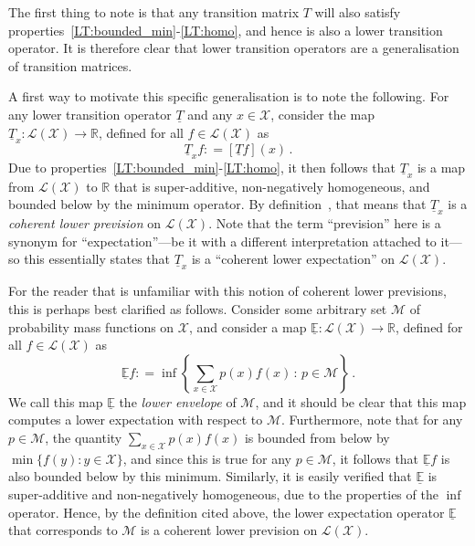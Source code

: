 \documentclass[10pt,a4paper]{paper}
\theoremstyle{definition}
\newcommand{\reals}{\mathbb{R}}
\newcommand{\states}{\mathcal{X}}
\newcommand{\lt}{\underline{T}}
\newcommand{\gambles}{\mathcal{L}}
\newcommand{\gamblesX}{\gambles(\states)}
\newcommand{\coloneqq}{:\!=}
\begin{document}
The first thing to note is that any transition matrix $T$ will also satisfy properties~\ref{LT:bounded_min}-\ref{LT:homo}, and hence is also a lower transition operator. It is therefore clear that lower transition operators are a generalisation of transition matrices.

A first way to motivate this specific generalisation is to note the following. For any lower transition operator $\lt$ and any $x\in\states$, consider the map $\lt_x:\gamblesX\to\reals$, defined for all $f\in\gamblesX$ as
\begin{equation}\label{eq:lowerprevisionfromlt}
\lt_xf \coloneqq \left[\lt f\right](x)\,.
\end{equation}
Due to properties~\ref{LT:bounded_min}-\ref{LT:homo}, it then follows that $\lt_x$ is a map from $\gamblesX$ to $\reals$ that is super-additive, non-negatively homogeneous, and bounded below by the minimum operator. By definition~\cite[Definition~2.3.3]{Walley:1991vk}, that means that $\lt_x$ is a \emph{coherent lower prevision} on $\gamblesX$. Note that the term ``prevision'' here is a synonym for ``expectation''---be it with a different interpretation attached to it---so this essentially states that $\lt_x$ is a ``coherent lower expectation'' on $\gamblesX$.

For the reader that is unfamiliar with this notion of coherent lower previsions, this is perhaps best clarified as follows. Consider some arbitrary set $\mathcal{M}$ of probability mass functions on $\states$, and consider a map $\underline{\mathbb{E}}:\gamblesX\to\reals$, defined for all $f\in\gamblesX$ as
\begin{equation*}
\underline{\mathbb{E}}f \coloneqq \inf\left\{\sum_{x\in\states} p(x)f(x)\,:\,p\in\mathcal{M}\right\}\,.
\end{equation*}
We call this map $\underline{\mathbb{E}}$ the \emph{lower envelope} of $\mathcal{M}$, and it should be clear that this map computes a lower expectation with respect to $\mathcal{M}$. Furthermore, note that for any $p\in\mathcal{M}$, the quantity $\sum_{x\in\states}p(x)f(x)$ is bounded from below by $\min\{f(y):y\in\states\}$, and since this is true for any $p\in\mathcal{M}$, it follows that $\underline{\mathbb{E}}f$ is also bounded below by this minimum. Similarly, it is easily verified that $\underline{\mathbb{E}}$ is super-additive and non-negatively homogeneous, due to the properties of the $\inf$ operator. Hence, by the definition cited above, the lower expectation operator $\underline{\mathbb{E}}$ that corresponds to $\mathcal{M}$ is a coherent lower prevision on $\gamblesX$. 
\end{document}
